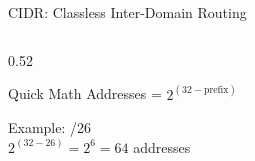 \documentclass[aspectratio=169]{beamer}  %
\begin{document}
\begin{frame}{CIDR: Classless Inter-Domain Routing}
\begin{columns}[T]
\begin{column}{0.52\textwidth}
            \vspace{0.3em}
            \begin{block}{Quick Math}
                Addresses = $2^{(32 - \text{prefix})}$
                
                \vspace{0.2em}
                Example: /26 \\
                $2^{(32-26)} = 2^6 = 64$ addresses
            \end{block}
        \end{column}
    \end{columns}
\end{frame}

\end{document}
